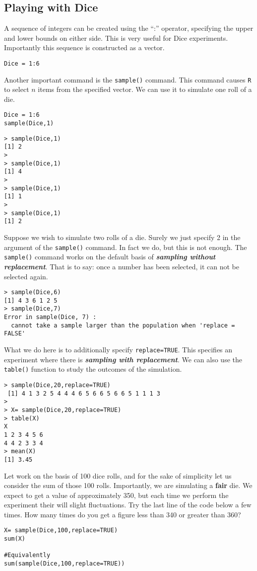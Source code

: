 \documentclass[11pt]{article} %
\begin{document}
\subsection{Playing with Dice}

A sequence of integers can be created using the “:” operator, specifying the upper and lower bounds on either side. This is very useful for Dice experiments. Importantly this sequence is constructed as a vector.
\begin{framed}
\begin{verbatim}
Dice = 1:6
\end{verbatim}
\end{framed}

Another important command is the \texttt{sample()} command. This command causes \texttt{R} to select $n$ items from the specified vector. We can use it to simulate one roll of a die.
\begin{framed}
\begin{verbatim}
Dice = 1:6
sample(Dice,1)
\end{verbatim}
\end{framed}
\begin{verbatim}
> sample(Dice,1)
[1] 2 
> 
> sample(Dice,1)
[1] 4 
>
> sample(Dice,1)
[1] 1
> 
> sample(Dice,1)
[1] 2
\end{verbatim}

\noindent Suppose we wish to simulate two rolls of a die. Surely we just specify 2 in the argument of the \texttt{sample()} command. In fact we do, but this is not enough.
The \texttt{sample()} command works on the default basis of \textbf{\textit{sampling without replacement}}. That is to say: once a number has been selected, it can not be selected again.
\begin{verbatim}
> sample(Dice,6)
[1] 4 3 6 1 2 5
> sample(Dice,7)
Error in sample(Dice, 7) : 
  cannot take a sample larger than the population when 'replace = FALSE'
\end{verbatim}
What we do here is to additionally specify \texttt{replace=TRUE}. This specifies an experiment where there is \textbf{\textit{sampling with replacement}}. We can also use the \texttt{table()} function to study the outcomes of the simulation.
\begin{verbatim}
> sample(Dice,20,replace=TRUE)
 [1] 4 1 3 2 5 4 4 4 6 5 6 6 5 6 6 5 1 1 1 3
>
> X= sample(Dice,20,replace=TRUE)
> table(X)
X
1 2 3 4 5 6 
4 4 2 3 3 4 
> mean(X)
[1] 3.45
\end{verbatim}
Let work on the basis of 100 dice rolls, and for the sake of simplicity let us consider the sum of those 100 rolls. Importantly, we are simulating a \textbf{fair} die. We expect to get a value of approximately 350, but each time we perform the experiment their will slight fluctuations.  Try the last line of the code below a few times. How many times do you get a figure less than 340 or greater than 360?
\begin{framed}
\begin{verbatim}
X= sample(Dice,100,replace=TRUE)
sum(X)

#Equivalently
sum(sample(Dice,100,replace=TRUE))
\end{verbatim}
\end{framed}
\newpage
\end{document}
